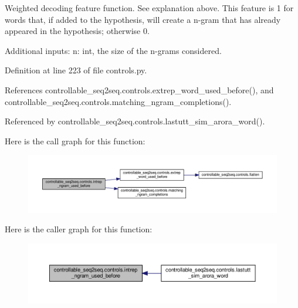\begin{DoxyVerb}Weighted decoding feature function. See explanation above.
This feature is 1 for words that, if added to the hypothesis, will create a n-gram
that has already appeared in the hypothesis; otherwise 0.

Additional inputs:
  n: int, the size of the n-grams considered.
\end{DoxyVerb}
 

Definition at line 223 of file controls.\+py.



References controllable\+\_\+seq2seq.\+controls.\+extrep\+\_\+word\+\_\+used\+\_\+before(), and controllable\+\_\+seq2seq.\+controls.\+matching\+\_\+ngram\+\_\+completions().



Referenced by controllable\+\_\+seq2seq.\+controls.\+lastutt\+\_\+sim\+\_\+arora\+\_\+word().

Here is the call graph for this function\+:
\nopagebreak
\begin{figure}[H]
\begin{center}
\leavevmode
\includegraphics[width=350pt]{namespacecontrollable__seq2seq_1_1controls_ae0245f482c87ad27a92efebe1d95d607_cgraph}
\end{center}
\end{figure}
Here is the caller graph for this function\+:
\nopagebreak
\begin{figure}[H]
\begin{center}
\leavevmode
\includegraphics[width=350pt]{namespacecontrollable__seq2seq_1_1controls_ae0245f482c87ad27a92efebe1d95d607_icgraph}
\end{center}
\end{figure}
\mbox{\label{namespacecontrollable__seq2seq_1_1controls_af7cfe0f401279ee7fa767d05fcb81286}} 
